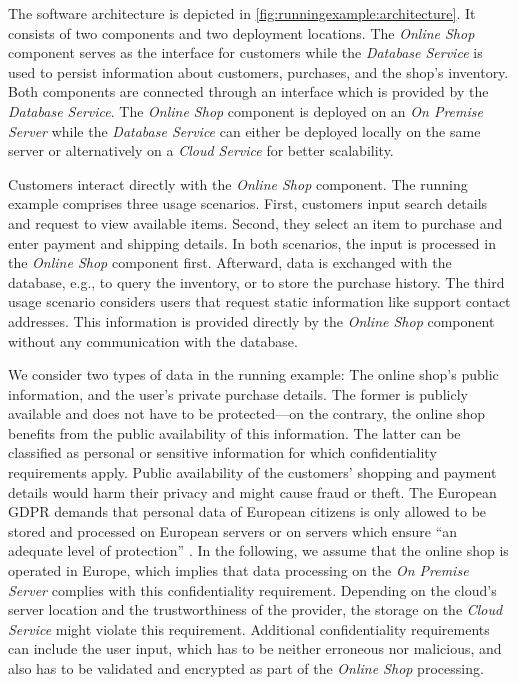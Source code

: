 The software architecture is depicted in \autoref{fig:runningexample:architecture}.
It consists of two components and two deployment locations. 
The \emph{Online Shop} component serves as the interface for customers while the \emph{Database Service} is used to persist information about customers, purchases, and the shop's inventory.
Both components are connected through an interface which is provided by the \emph{Database Service}.
The \emph{Online Shop} component is deployed on an \emph{On Premise Server} while the \emph{Database Service} can either be deployed locally on the same server or alternatively on a \emph{Cloud Service} for better scalability.

Customers interact directly with the \emph{Online Shop} component.
The running example comprises three usage scenarios.
First, customers input search details and request to view available items.
Second, they select an item to purchase and enter payment and shipping details.
In both scenarios, the input is processed in the \emph{Online Shop} component first.
Afterward, data is exchanged with the database, e.g., to query the inventory, or to store the purchase history.
The third usage scenario considers users that request static information like support contact addresses.
This information is provided directly by the \emph{Online Shop} component without any communication with the database.

We consider two types of data in the running example: The online shop's public information, and the user's private purchase details.
The former is publicly available and does not have to be protected---on the contrary, the online shop benefits from the public availability of this information.
The latter can be classified as personal or sensitive information for which confidentiality requirements apply.
Public availability of the customers' shopping and payment details would harm their privacy and might cause fraud or theft.
The European \acf{GDPR} demands that personal data of European citizens is only allowed to be stored and processed on European servers or on servers which ensure \enquote{an adequate level of protection} \cite[Art.~45]{council_of_european_union_regulation_2016}.
In the following, we assume that the online shop is operated in Europe, which implies that data processing on the \emph{On Premise Server} complies with this confidentiality requirement.
Depending on the cloud's server location and the trustworthiness of the provider, the storage on the \emph{Cloud Service} might violate this requirement.
Additional confidentiality requirements can include the user input, which has to be neither erroneous nor malicious, and also has to be validated and encrypted as part of the \emph{Online Shop} processing.

